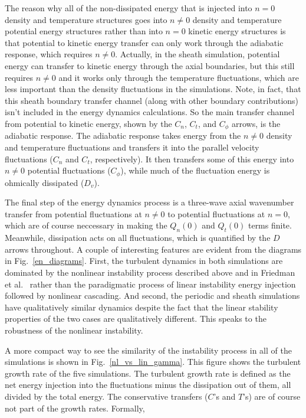 \documentclass[showpacs,preprintnumbers,amsmath,amssymb,superscriptaddress,aip]{revtex4-1}
\begin{document}
The reason why all of the non-dissipated energy that is injected into $n=0$ density and temperature structures goes into 
$n \ne 0$ density and temperature potential energy structures rather than into $n=0$
kinetic energy structures is that potential to kinetic energy transfer can only work through the adiabatic response, which requires $n \ne 0$. Actually, in the sheath simulation, potential energy
can transfer to kinetic energy through the axial boundaries, but this still requires $n \ne 0$ and it works only through the temperature fluctuations, which are less important than the density
fluctuations in the simulations. Note, in fact, that this sheath boundary transfer channel (along with other boundary contributions) isn't included in the energy dynamics calculations.
So the main transfer channel from potential to kinetic energy, shown by the $C_n$, $C_t$, and $C_\phi$ arrows, is the adiabatic response. The adiabatic response takes energy
from the $n \ne 0$ density and temperature fluctuations and transfers it into the parallel velocity fluctuations ($C_n$ and $C_t$, respectively). It then transfers some of this energy into
$n \ne 0$ potential fluctuations ($C_\phi$), while much of the fluctuation energy is ohmically dissipated ($D_v$).

The final step of the energy dynamics process is a three-wave axial wavenumber transfer from potential fluctuations at $n \ne 0$ to potential fluctuations at $n=0$, which are of course neccessary
in making the $Q_n(0)$ and $Q_t(0)$ terms finite. Meanwhile, dissipation acts on all fluctuations, which is quantified by the $D$ arrows throughout. A couple of interesting features are evident
from the diagrams in Fig.~\ref{en_diagrams}. 
First, the turbulent dynamics in both simulations are dominated by the nonlinear instability process described above and in Friedman et al.~\cite{friedman2012b}
rather than the paradigmatic process of linear instability energy injection followed by nonlinear cascading. And second,
the periodic and sheath simulations have qualitatively similar dynamics despite the fact that the linear stability properties of the two cases
are qualitatively different. This speaks to the robustness of the nonlinear instability.

A more compact way to see the similarity of the instability process in all of the simulations is shown in Fig.~\ref{nl_vs_lin_gamma}. 
This figure shows the turbulent growth rate of the five simulations. 
The turbulent growth rate is defined as the net energy injection
into the fluctuations minus the dissipation out of them, all divided by the total energy. The conservative transfers ($C$'s and $T$'s) are of course not part of the growth rates.
Formally, 
\end{document}
